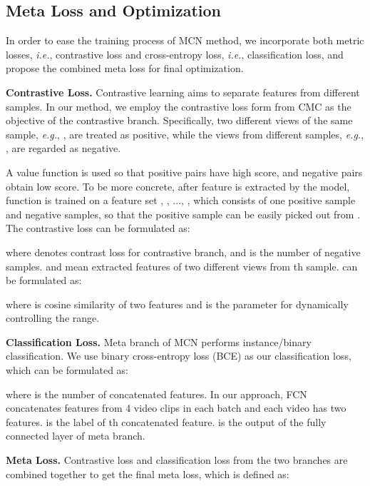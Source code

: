 \documentclass[10pt,twocolumn,letterpaper]{article}
\begin{document}
\subsection{Meta Loss and Optimization}
In order to ease the training process of MCN method, we incorporate both metric losses, \textit{i.e.}, contrastive loss and cross-entropy loss, \textit{i.e.}, classification loss, and propose the combined meta loss for final optimization.


\label{loss_and_optimization}
\textbf{Contrastive Loss.} Contrastive learning aims to separate features from different samples. In our method, we employ the contrastive loss form from CMC \cite{tian2019contrastive} as the objective of the contrastive branch. Specifically, two different views of the same sample, \textit{e.g.}, , are treated as positive, while the views from different samples, \textit{e.g.},  , are regarded as negative. 

A value function  is used so that positive pairs  have high score, and negative pairs obtain low score. To be more concrete, after feature  is extracted by the model, function  is trained on a feature set   , , ..., , which consists of one positive sample  and  negative samples, so that the positive sample can be easily picked out from . The contrastive loss can be formulated as:



\noindent where  denotes contrast loss for contrastive branch, and  is the number of negative samples.  and  mean extracted features of two different views from th sample.  can be formulated as:
	



\noindent where  is cosine similarity of two features and  is the parameter for dynamically controlling the range.

\textbf{Classification Loss.}
Meta branch of MCN performs instance/binary classification. We use binary cross-entropy loss (BCE) as our classification loss, which can be formulated as:




\noindent where  is the number of concatenated features. In our approach, FCN concatenates features from 4 video clips in each batch and each video has two features.  is the label of th concatenated feature.  is the output of the fully connected layer of meta branch. 

\textbf{Meta Loss.} Contrastive loss and classification loss from the two branches are combined together to get the final meta loss, which is defined as:
\end{document}
